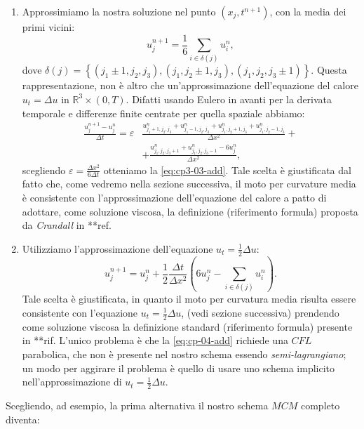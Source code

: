 \begin{enumerate}
  \item Approssimiamo la nostra soluzione nel punto $(x_j,t^{n+1})$, con la media dei primi vicini:
    \begin{equation}
      \label{eq:cp3-03-add}
      u_j^{n+1}=\frac{1}{6}\sum_{i\in\delta(j)}u_i^n,
    \end{equation}
dove $\delta(j)=\left\{(j_1\pm 1,j_2,j_3),(j_1,j_2\pm 1,j_3),(j_1,j_2,j_3\pm 1)\right\}$. Questa rappresentazione, non è altro che un'approssimazione dell'equazione del calore $u_t=\Delta u$ in $\mathbb{R}^3\times(0,T)$. Difatti usando Eulero in avanti per la derivata temporale e differenze finite centrate per quella spaziale abbiamo:
\[
\begin{aligned}
  \frac{u_j^{n+1}-u_j^n}{\Delta t}=\varepsilon&\frac{u_{j_1 + 1,j_2,j_3}^n +
    u_{j_1 - 1,j_2,j_3}^n + u_{j_1,j_2 + 1,j_3}^n + u_{j_1,j_2 - 1,j_3}^n}{\Delta x^2} + \\
    &+ \frac{u_{j_1,j_2,j_3 + 1}^n + u_{j_1,j_2,j_3 - 1}^n - 6u_j^n}{\Delta x^2},
\end{aligned}
\]
scegliendo $\varepsilon=\frac{\Delta x^2}{6\Delta t}$ otteniamo la \eqref{eq:cp3-03-add}.
Tale scelta è giustificata dal fatto che, come vedremo nella sezione successiva, il moto per curvature media è consistente con l'approssimazione dell'equazione del calore a patto di adottare, come soluzione viscosa, la definizione (riferimento formula) proposta da \emph{Crandall} in **ref.

  \item Utilizziamo l'approssimazione dell'equazione $u_t=\frac{1}{2}\Delta u$:
    \begin{equation}
      \label{eq:cp-04-add}
      u_j^{n+1}=u_j^n +\frac{1}{2}\frac{\Delta t}{\Delta x^2}\left(6u_j^n - \sum_{i\in\delta(j)}u_i^n\right).
    \end{equation}
Tale scelta è giustificata, in quanto il moto per curvatura media risulta essere consistente con l'equazione $u_t=\frac{1}{2}\Delta u$, (vedi sezione successiva) prendendo come soluzione viscosa la definizione standard (riferimento formula) presente in **rif. L'unico problema è che la \eqref{eq:cp-04-add}
richiede una $\mathit{CFL}$ parabolica, che non è presente nel nostro schema essendo \emph{semi-lagrangiano}; un modo per aggirare il problema è quello di usare uno schema implicito nell'approssimazione di  $u_t=\frac{1}{2}\Delta u$.
\end{enumerate}
Scegliendo, ad esempio, la prima alternativa il nostro schema $\mathit{MCM}$ completo diventa:
